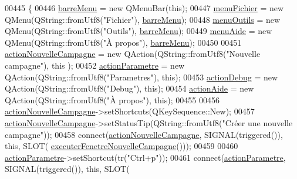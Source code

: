 \begin{DoxyCode}
00445 \{
00446     \hyperlink{class_i_h_m_rov_a169e28bc630468d13c05de321f66ca3c}{barreMenu} = \textcolor{keyword}{new} QMenuBar(\textcolor{keyword}{this});
00447     \hyperlink{class_i_h_m_rov_ad110a9a5cfabc48491ee602075e28066}{menuFichier} = \textcolor{keyword}{new} QMenu(QString::fromUtf8(\textcolor{stringliteral}{"Fichier"}), \hyperlink{class_i_h_m_rov_a169e28bc630468d13c05de321f66ca3c}{barreMenu});
00448     \hyperlink{class_i_h_m_rov_aab4af4ee5ffb959869ee5f181fe4204e}{menuOutils} = \textcolor{keyword}{new} QMenu(QString::fromUtf8(\textcolor{stringliteral}{"Outils"}), \hyperlink{class_i_h_m_rov_a169e28bc630468d13c05de321f66ca3c}{barreMenu});
00449     \hyperlink{class_i_h_m_rov_a7de335b17ef7b92fdb203cd385ba874f}{menuAide} = \textcolor{keyword}{new} QMenu(QString::fromUtf8(\textcolor{stringliteral}{"À propos"}), \hyperlink{class_i_h_m_rov_a169e28bc630468d13c05de321f66ca3c}{barreMenu});
00450 
00451     \hyperlink{class_i_h_m_rov_a1ea738e5224f6fa4fc61ac064b5d9a6e}{actionNouvelleCampagne} = \textcolor{keyword}{new} QAction(QString::fromUtf8(\textcolor{stringliteral}{"Nouvelle campagne"}), \textcolor{keyword}{this}
      );
00452     \hyperlink{class_i_h_m_rov_aa1864bc274cc5662b212a3530255e4ad}{actionParametre} = \textcolor{keyword}{new} QAction(QString::fromUtf8(\textcolor{stringliteral}{"Parametres"}), \textcolor{keyword}{this});
00453     \hyperlink{class_i_h_m_rov_abf3ebd717e5d59355dd271917962083f}{actionDebug} = \textcolor{keyword}{new} QAction(QString::fromUtf8(\textcolor{stringliteral}{"Debug"}), \textcolor{keyword}{this});
00454     \hyperlink{class_i_h_m_rov_aecd3c0b54390e60f6e1ba14787c68828}{actionAide} = \textcolor{keyword}{new} QAction(QString::fromUtf8(\textcolor{stringliteral}{"À propos"}), \textcolor{keyword}{this});
00455 
00456     \hyperlink{class_i_h_m_rov_a1ea738e5224f6fa4fc61ac064b5d9a6e}{actionNouvelleCampagne}->setShortcuts(QKeySequence::New);
00457     \hyperlink{class_i_h_m_rov_a1ea738e5224f6fa4fc61ac064b5d9a6e}{actionNouvelleCampagne}->setStatusTip(QString::fromUtf8(\textcolor{stringliteral}{"Créer une nouvelle
       campagne"}));
00458     connect(\hyperlink{class_i_h_m_rov_a1ea738e5224f6fa4fc61ac064b5d9a6e}{actionNouvelleCampagne}, SIGNAL(triggered()), \textcolor{keyword}{this}, SLOT(
      \hyperlink{class_i_h_m_rov_a3169e8cd9132ece69af974648066c6c1}{executerFenetreNouvelleCampagne}()));
00459 
00460     \hyperlink{class_i_h_m_rov_aa1864bc274cc5662b212a3530255e4ad}{actionParametre}->setShortcut(tr(\textcolor{stringliteral}{"Ctrl+p"}));
00461     connect(\hyperlink{class_i_h_m_rov_aa1864bc274cc5662b212a3530255e4ad}{actionParametre}, SIGNAL(triggered()), \textcolor{keyword}{this}, SLOT(

\end{DoxyCode}
